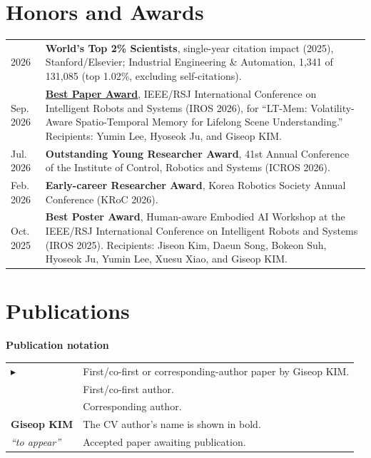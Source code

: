 \documentclass[10pt,a4paper]{article}
\makeatletter
\renewcommand{\arraystretch}{1.08}
\newcommand{\daterow}[2]{#1 & #2 \\[2.2pt]}
\newcommand{\leadpub}{\textbf{\ensuremath{\blacktriangleright}}\hspace{0.25em}}
\newcommand{\me}{\textbf{Giseop KIM}}
\newenvironment{legendtable}{%
  \par\vspace{3pt}\noindent%
  \begin{minipage}{115mm}
  \small
  \renewcommand{\arraystretch}{1.0}
  \textbf{Publication notation}\par\vspace{1pt}
  \begin{tabular}{@{}L{24mm}@{\hspace{4mm}}L{\dimexpr\linewidth-28mm\relax}@{}}
  \toprule
}{\bottomrule\end{tabular}\end{minipage}\par\vspace{3pt}}
\newcommand{\legendmark}[1]{{\normalsize\bfseries #1}}
\makeatother
\begin{document}
\section{Honors and Awards}
\begin{tabularx}{\textwidth}{@{}L{34mm}Y@{}}
\daterow{2026}{\textbf{World's Top 2\% Scientists}, single-year citation impact (2025), Stanford/Elsevier; Industrial Engineering \& Automation, 1,341 of 131,085 (top 1.02\%, excluding self-citations).}
\daterow{Sep. 2026}{\textbf{\href{https://team-aprl.github.io/gallery.html\#iros2026-best-paper-award}{Best Paper Award}}, IEEE/RSJ International Conference on Intelligent Robots and Systems (IROS 2026), for ``LT-Mem: Volatility-Aware Spatio-Temporal Memory for Lifelong Scene Understanding.'' Recipients: Yumin Lee, Hyoseok Ju, and Giseop KIM.}
\daterow{Jul. 2026}{\textbf{Outstanding Young Researcher Award}, 41st Annual Conference of the Institute of Control, Robotics and Systems (ICROS 2026).}
\daterow{Feb. 2026}{\textbf{Early-career Researcher Award}, Korea Robotics Society Annual Conference (KRoC 2026).}
\daterow{Oct. 2025}{\textbf{Best Poster Award}, Human-aware Embodied AI Workshop at the IEEE/RSJ International Conference on Intelligent Robots and Systems (IROS 2025). Recipients: Jiseon Kim, Daeun Song, Bokeon Suh, Hyoseok Ju, Yumin Lee, Xuesu Xiao, and Giseop KIM.}
\end{tabularx}

\section{Publications}
\begin{legendtable}
\legendmark{\leadpub} & First/co-first or corresponding-author paper by Giseop KIM. \\[1pt]
\legendmark{*} & First/co-first author. \\[1pt]
\legendmark{\dag} & Corresponding author. \\[1pt]
\me & The CV author's name is shown in bold. \\[1pt]
\textit{``to appear''} & Accepted paper awaiting publication. \\
\end{legendtable}
\end{document}

